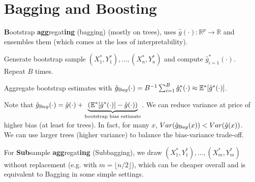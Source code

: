 \section{Bagging and Boosting}\label{sec:bagging_and_boosting}
\begin{sectionbox}\nospacing{}
  \textbf{B}ootstrap \textbf{agg}regat\textbf{ing} (bagging) (mostly on trees), uses $\hat g(\cdot): \mathbb{R}^{p}\to \mathbb{R}$ and ensembles them (which comes at the loss of interpretability).
  \begin{enumeratenosep}[label=\roman*]
    \item Generate bootstrap sample $(X_{1}^{\ast}, Y_{1}^{\ast}), \dots, (X_{n}^{\ast}, Y_{n}^{\ast})$ and compute $\hat{g}^{\ast}_{i=1}(\cdot)$. Repeat $B$ times.
    \item Aggregate bootstrap estimates with $\hat{g}_{\textrm Bag}(\cdot) = B^{-1}\sum_{i=1}^{B} \hat{g}^{\ast}_{i}(\cdot) \approx \mathbb{E}^{\ast}[\hat{g}^{\ast}(\cdot)]$.
  \end{enumeratenosep}
  Note that $\hat{g}_{\textrm Bag}(\cdot) = \hat{g}(\cdot) + \underbrace{(\mathbb{E}^{\ast}[\hat{g}^{\ast}(\cdot)] -\hat{g}(\cdot))}_{\text{bootstrap bias estimate}}$.
  We can reduce variance at price of higher bias (at least for trees).
  In fact, for many $x$, $Var(\hat{g}_{\textrm Bag}(x)) < Var(\hat{g}(x))$. We can use larger trees (higher variance) to balance the bias-variance trade-off.

  For \textbf{Sub}sample \textbf{agg}regat\textbf{ing} (Subbagging), we draw $(X_{1}^{\ast}, Y_{1}^{\ast}), \dots, (X_{m}^{\ast}, Y_{m}^{\ast})$ without replacement (e.g. with $m = \lfloor n/2\rfloor$), which can be cheaper overall and is equivalent to Bagging in some simple settings.
\end{sectionbox}

